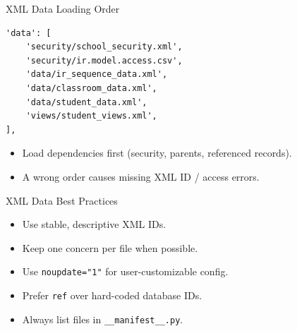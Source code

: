 \begin{frame}[fragile]{XML Data Loading Order}
\begin{lstlisting}
'data': [
	'security/school_security.xml',
	'security/ir.model.access.csv',
	'data/ir_sequence_data.xml',
	'data/classroom_data.xml',
	'data/student_data.xml',
	'views/student_views.xml',
],
\end{lstlisting}
	\begin{itemize}
		\item Load dependencies first (security, parents, referenced records).
		\item A wrong order causes missing XML ID / access errors.
	\end{itemize}
\end{frame}

\begin{frame}{XML Data Best Practices}
	\begin{itemize}
		\item Use stable, descriptive XML IDs.
		\item Keep one concern per file when possible.
		\item Use \texttt{noupdate="1"} for user-customizable config.
		\item Prefer \texttt{ref} over hard-coded database IDs.
		\item Always list files in \texttt{\_\_manifest\_\_.py}.
	\end{itemize}
\end{frame}
